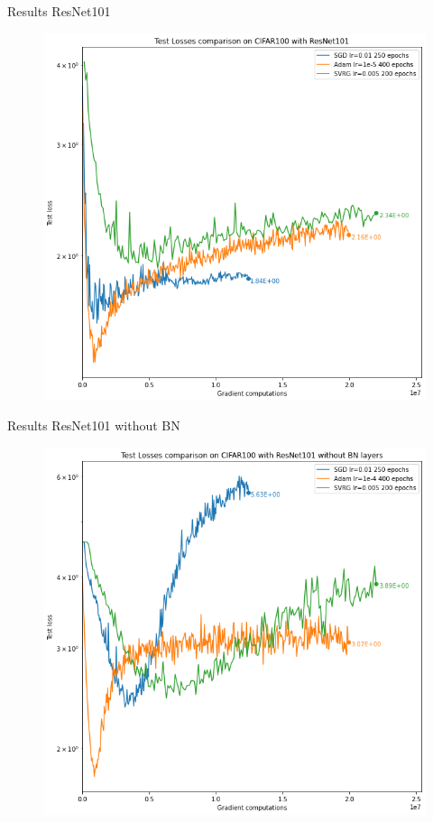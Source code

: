 \documentclass[10pt]{beamer}
\begin{document}
\begin{frame}{Results ResNet101}
     \begin{figure}
         \centering
         \includegraphics[scale=0.35]{report/figures/ResNet101Results.png}
         \label{fig:resnet101results}
     \end{figure}
\end{frame}

\begin{frame}{Results ResNet101 without BN}
      \begin{figure}
         \centering
         \includegraphics[scale=0.35]{report/figures/ResNet101noBNResults.png}
         \label{fig:resnet101noBNresults}
     \end{figure}
\end{frame}
\end{document}
